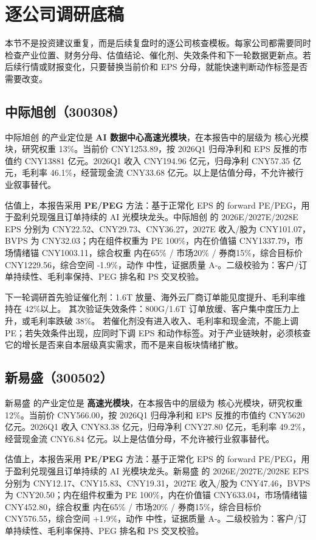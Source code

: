 \section{逐公司调研底稿}
本节不是投资建议重复，而是后续复盘时的逐公司核查模板。每家公司都需要同时检查产业位置、财务分母、估值结论、催化剂、失效条件和下一轮数据更新点。若后续行情或财报变化，只要替换当前价和 EPS 分母，就能快速判断动作标签是否需要改变。

\subsection{中际旭创（300308）}
中际旭创 的产业定位是 \textbf{AI 数据中心高速光模块}，在本报告中的层级为 核心光模块，研究权重 13\%。当前价 CNY1253.89，按 2026Q1 归母净利和 EPS 反推的市值约 CNY13881 亿元。2026Q1 收入 CNY194.96 亿元，归母净利 CNY57.35 亿元，毛利率 46.1\%，经营现金流 CNY33.68 亿元。以上是估值分母，不允许被行业叙事替代。

估值上，本报告采用 \textbf{PE/PEG} 方法：基于正常化 EPS 的 forward PE/PEG，用于盈利兑现强且订单持续的 AI 光模块龙头。中际旭创 的 2026E/2027E/2028E EPS 分别为 CNY22.52、CNY29.73、CNY36.27，2027E 收入/股为 CNY101.07，BVPS 为 CNY32.03；内在组件权重为 PE 100\%，内在价值锚 CNY1337.79，市场情绪锚 CNY1003.11，综合权重 内在65\% / 市场20\% / 券商15\%，综合目标价 CNY1229.56，综合空间 -1.9\%，动作 中性，证据质量 A-。二级校验为：客户/订单持续性、毛利率保持、PEG 排名和 PS 交叉校验。

下一轮调研首先验证催化剂：1.6T 放量、海外云厂商订单能见度提升、毛利率维持在 42\%以上。 其次验证失效条件：800G/1.6T 订单放缓、客户集中度压力上升，或毛利率跌破 38\%。 若催化剂没有进入收入、毛利率和现金流，不能上调 PE；若失效条件出现，应同时下调 EPS 和动作标签。对于产业链映射，必须核查它的增长是否来自本层级真实需求，而不是来自板块情绪扩散。


\subsection{新易盛（300502）}
新易盛 的产业定位是 \textbf{高速光模块}，在本报告中的层级为 核心光模块，研究权重 12\%。当前价 CNY566.00，按 2026Q1 归母净利和 EPS 反推的市值约 CNY5620 亿元。2026Q1 收入 CNY83.38 亿元，归母净利 CNY27.80 亿元，毛利率 49.2\%，经营现金流 CNY6.84 亿元。以上是估值分母，不允许被行业叙事替代。

估值上，本报告采用 \textbf{PE/PEG} 方法：基于正常化 EPS 的 forward PE/PEG，用于盈利兑现强且订单持续的 AI 光模块龙头。新易盛 的 2026E/2027E/2028E EPS 分别为 CNY12.17、CNY15.83、CNY19.31，2027E 收入/股为 CNY47.46，BVPS 为 CNY20.50；内在组件权重为 PE 100\%，内在价值锚 CNY633.04，市场情绪锚 CNY452.80，综合权重 内在65\% / 市场20\% / 券商15\%，综合目标价 CNY576.55，综合空间 +1.9\%，动作 中性，证据质量 A-。二级校验为：客户/订单持续性、毛利率保持、PEG 排名和 PS 交叉校验。


